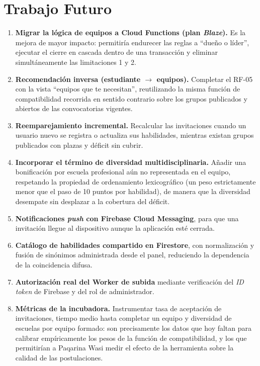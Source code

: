 \documentclass[12pt,a4paper]{article}
\begin{document}
\newpage
\section{Trabajo Futuro}
\label{sec:futuro}

\begin{enumerate}
    \item \textbf{Migrar la lógica de equipos a Cloud Functions (plan \emph{Blaze}).} Es la mejora de mayor impacto: permitiría endurecer las reglas a ``dueño o líder'', ejecutar el cierre en cascada dentro de una transacción y eliminar simultáneamente las limitaciones 1 y 2.

    \item \textbf{Recomendación inversa (estudiante $\rightarrow$ equipos).} Completar el RF-05 con la vista ``equipos que te necesitan'', reutilizando la misma función de compatibilidad recorrida en sentido contrario sobre los grupos publicados y abiertos de las convocatorias vigentes.

    \item \textbf{Reemparejamiento incremental.} Recalcular las invitaciones cuando un usuario nuevo se registra o actualiza sus habilidades, mientras existan grupos publicados con plazas y déficit sin cubrir.

    \item \textbf{Incorporar el término de diversidad multidisciplinaria.} Añadir una bonificación por escuela profesional aún no representada en el equipo, respetando la propiedad de ordenamiento lexicográfico (un peso estrictamente menor que el paso de 10 puntos por habilidad), de manera que la diversidad desempate sin desplazar a la cobertura del déficit.

    \item \textbf{Notificaciones \emph{push} con Firebase Cloud Messaging}, para que una invitación llegue al dispositivo aunque la aplicación esté cerrada.

    \item \textbf{Catálogo de habilidades compartido en Firestore}, con normalización y fusión de sinónimos administrada desde el panel, reduciendo la dependencia de la coincidencia difusa.

    \item \textbf{Autorización real del Worker de subida} mediante verificación del \emph{ID token} de Firebase y del rol de administrador.

    \item \textbf{Métricas de la incubadora.} Instrumentar tasa de aceptación de invitaciones, tiempo medio hasta completar un equipo y diversidad de escuelas por equipo formado: son precisamente los datos que hoy faltan para calibrar empíricamente los pesos de la función de compatibilidad, y los que permitirían a Paqarina Wasi medir el efecto de la herramienta sobre la calidad de las postulaciones.
\end{enumerate}
\end{document}
